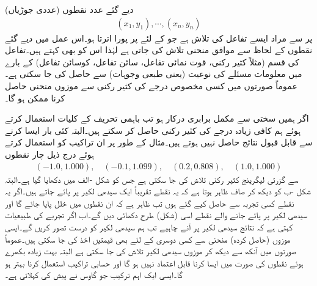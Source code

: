 دیے گئے  عدد نقطوں (عددی جوڑیاں)
\begin{align*}
(x_1,y_1),\cdots,(x_n,y_n)
\end{align*}
پر   سے مراد ایسے تفاعل  کی تلاش ہے  جو   کے لئے  پر پورا اترتا ہو۔اس عمل میں دیے گئے نقطوں کے لحاظ سے موافق منحنی تلاش کی جاتی ہے لہٰذا اس  کو   بھی کہتے ہیں۔تفاعل کی قسم (مثلاً کثیر رکنی، قوت نمائی تفاعل، سائن تفاعل، کوسائن تفاعل) کے بارے میں معلومات مسئلے کی نوعیت (یعنی طبعی وجوہات) سے حاصل کی جا سکتی ہے۔عموماً صورتوں میں کسی مخصوص درجے کی کثیر رکنی سے  موزوں منحنی حاصل کرنا ممکن ہو گا۔

 اگر ہمیں  سختی سے  مکمل برابری   درکار ہو تب باہمی تحریف کے کلیات استعمال کرتے ہوئے  ہم کافی زیادہ درجے کی کثیر رکنی  حاصل کر سکتے ہیں۔البتہ کئی بار ایسا کرنے سے  قابل قبول نتائج حاصل نہیں ہوتے ہیں۔مثال کے طور پر ان تراکیب کو استعمال کرتے ہوئے درج ذیل چار نقطوں
\begin{align}\label{مساوات_خطی_اعدادی_کمتر_مربع_شرائط_الف}
(-1.0,1.000),\quad (-0.1,1.099),\quad (0.2,0.808),\quad (1.0,1.000)
\end{align}
سے گزرتی لیگرینج کثیر رکنی  تلاش کی جا سکتی ہے جس کو شکل -الف میں دکھایا گیا ہے۔البتہ شکل -ب کو دیکھ کر صاف ظاہر ہوتا ہے کہ یہ نقطے تقریباً ایک سیدھی لکیر پر پائے جاتے ہیں۔اگر یہ نقطے کسی تجربہ سے حاصل کیے گئے ہوں تب ظاہر ہے کہ ان نقطوں میں خلل پایا جائے گا اور سیدھی لکیر پر پائے جانے والے نقطے اسی  (شکل) طرح دکھائی دیں گے۔اب اگر تجربے کی طبیعیات کہتی ہے کہ نتائج سیدھی لکیر پر آنے چاہیے تب ہم سیدھی لکیر کو درست تصور کریں گے۔ایسی موزوں (حاصل کردہ) منحنی سے کسی دوسری  کے لئے بھی قیمتیں اخذ کی جا سکتی ہیں۔عموماً صورتوں میں آنکھ سے دیکھ کر موزوں سیدھی لکیر تلاش کی جا سکتی ہے البتہ بہت زیادہ بکھرے  ہوئے نقطوں کی صورت میں ایسا کرنا قابل اعتماد نہیں ہو گا اور حسابی تراکیب استعمال کرنا بہتر ہو گا۔ایسی ایک اہم ترکیب جو گاوس نے پیش کی   کہلاتی ہے۔
